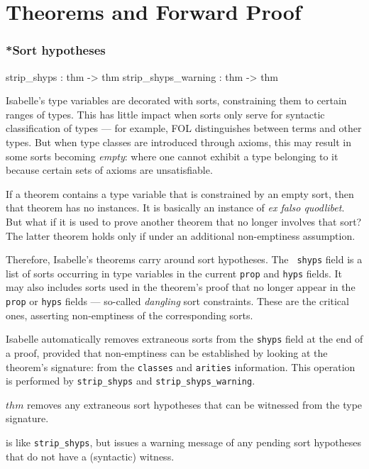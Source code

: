 
\chapter{Theorems and Forward Proof}

\subsection{*Sort hypotheses} \label{sec:sort-hyps}

\begin{ttbox} 
strip_shyps         : thm -> thm
strip_shyps_warning : thm -> thm
\end{ttbox}

Isabelle's type variables are decorated with sorts, constraining them to
certain ranges of types.  This has little impact when sorts only serve for
syntactic classification of types --- for example, FOL distinguishes between
terms and other types.  But when type classes are introduced through axioms,
this may result in some sorts becoming {\em empty\/}: where one cannot exhibit
a type belonging to it because certain sets of axioms are unsatisfiable.

If a theorem contains a type variable that is constrained by an empty
sort, then that theorem has no instances.  It is basically an instance
of {\em ex falso quodlibet}.  But what if it is used to prove another
theorem that no longer involves that sort?  The latter theorem holds
only if under an additional non-emptiness assumption.

Therefore, Isabelle's theorems carry around sort hypotheses.  The {\tt
shyps} field is a list of sorts occurring in type variables in the current
{\tt prop} and {\tt hyps} fields.  It may also includes sorts used in the
theorem's proof that no longer appear in the {\tt prop} or {\tt hyps}
fields --- so-called {\em dangling\/} sort constraints.  These are the
critical ones, asserting non-emptiness of the corresponding sorts.
 
Isabelle automatically removes extraneous sorts from the {\tt shyps} field at
the end of a proof, provided that non-emptiness can be established by looking
at the theorem's signature: from the {\tt classes} and {\tt arities}
information.  This operation is performed by \texttt{strip_shyps} and
\texttt{strip_shyps_warning}.

\begin{ttdescription}
  
\item[\ttindexbold{strip_shyps} $thm$] removes any extraneous sort hypotheses
  that can be witnessed from the type signature.
  
\item[\ttindexbold{strip_shyps_warning}] is like \texttt{strip_shyps}, but
  issues a warning message of any pending sort hypotheses that do not have a
  (syntactic) witness.

\end{ttdescription}


